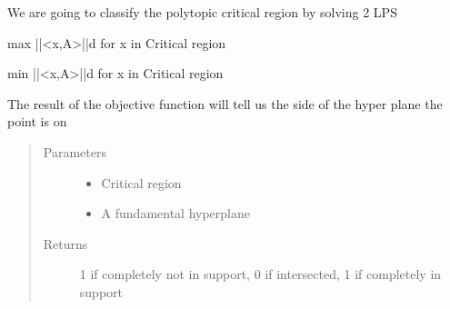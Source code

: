 \documentclass[letterpaper,10pt,english]{sphinxmanual}
\begin{document}

\begin{fulllineitems}
\label{\detokenize{ppopt.upop:ppopt.upop.ucontroller.classify_polytope}}
\sphinxAtStartPar
We are going to classify the polytopic critical region by solving 2 LPS

\sphinxAtStartPar
max ||\textless{}x,A\textgreater{}||\sphinxhyphen{}d for x in Critical region

\sphinxAtStartPar
min ||\textless{}x,A\textgreater{}||\sphinxhyphen{}d for x in Critical region

\sphinxAtStartPar
The result of the objective function will tell us the side of the hyper plane the point is on
\begin{quote}\begin{description}
\item[{Parameters}] \leavevmode\begin{itemize}
\item {} 
\sphinxAtStartPar
{} \textendash{} Critical region

\item {} 
\sphinxAtStartPar
{} \textendash{} A fundamental hyperplane

\end{itemize}

\item[{Returns}] \leavevmode
\sphinxAtStartPar
\sphinxhyphen{}1 if completely not in support, 0 if intersected, 1 if completely in support

\end{description}\end{quote}

\end{fulllineitems}

\end{document}
